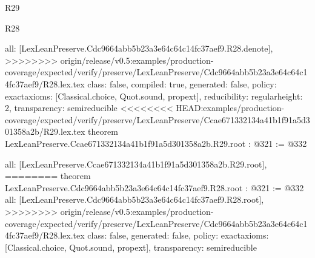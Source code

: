 \begin{lexlean}{R29}
\begin{lexlean}{R28}
\begin{coremodule}
{{{{{  all: [LexLeanPreserve.Cdc9664abb5b23a3e64c64c14fc37aef9.R28.denote],
>>>>>>>> origin/release/v0.5:examples/production-coverage/expected/verify/preserve/LexLeanPreserve/Cdc9664abb5b23a3e64c64c14fc37aef9/R28.lex.tex
  class: false,
  compiled: true,
  generated: false,
  policy: exact{axioms: [Classical.choice, Quot.sound, propext]},
  reducibility: regular{height: 2},
  transparency: semireducible
}
<<<<<<<< HEAD:examples/production-coverage/expected/verify/preserve/LexLeanPreserve/Ccae671332134a41b1f91a5d301358a2b/R29.lex.tex
theorem LexLeanPreserve.Ccae671332134a41b1f91a5d301358a2b.R29.root : @321 := @332 {
  all: [LexLeanPreserve.Ccae671332134a41b1f91a5d301358a2b.R29.root],
========
theorem LexLeanPreserve.Cdc9664abb5b23a3e64c64c14fc37aef9.R28.root : @321 := @332 {
  all: [LexLeanPreserve.Cdc9664abb5b23a3e64c64c14fc37aef9.R28.root],
>>>>>>>> origin/release/v0.5:examples/production-coverage/expected/verify/preserve/LexLeanPreserve/Cdc9664abb5b23a3e64c64c14fc37aef9/R28.lex.tex
  class: false,
  generated: false,
  policy: exact{axioms: [Classical.choice, Quot.sound, propext]},
  transparency: semireducible
}

}}}}}
\end{coremodule}
\end{lexlean}
\end{lexlean}
